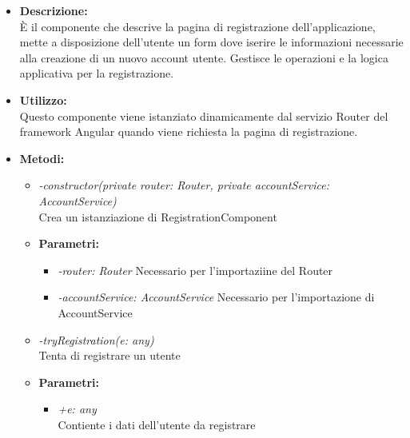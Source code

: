 \begin{itemize}
    \item \textbf{Descrizione:}\\
    È il componente che descrive la pagina di registrazione dell’applicazione, mette a disposizione dell’utente un form dove iserire le informazioni necessarie alla creazione di un nuovo account utente. Gestisce le operazioni e la logica applicativa per la registrazione.
    \item \textbf{Utilizzo:}\\
    Questo componente viene istanziato dinamicamente dal servizio Router del framework Angular quando viene richiesta la pagina di registrazione.
	\item \textbf{Metodi:}
    \begin{itemize}
    	\item \emph{-constructor(private router: Router, private accountService: AccountService)}\\
    	Crea un istanziazione di RegistrationComponent
    	\item \textbf{Parametri:}
    		\begin{itemize}
    			\item \emph{-router: Router}
    			Necessario per l'importaziine del Router
    			\item \emph{-accountService: AccountService}
    			Necessario per l'importazione di AccountService
    		\end{itemize}
    	\item \emph{-tryRegistration(e: any)}\\
    	Tenta di registrare un utente
    	\item \textbf{Parametri:}
    		\begin{itemize}
    			\item \emph{+e: any}\\
    			Contiente i dati dell'utente da registrare
    		\end{itemize}
    \end{itemize}
\end{itemize}